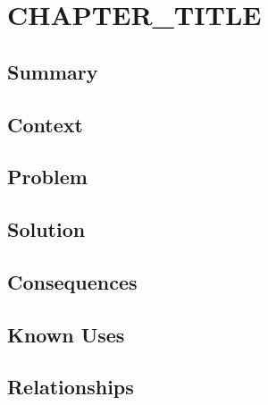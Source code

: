 \chapter{CHAPTER_TITLE}

\section{Summary}

\section{Context}

\section{Problem}

\section{Solution}

\section{Consequences}

\section{Known Uses}

\section{Relationships}




